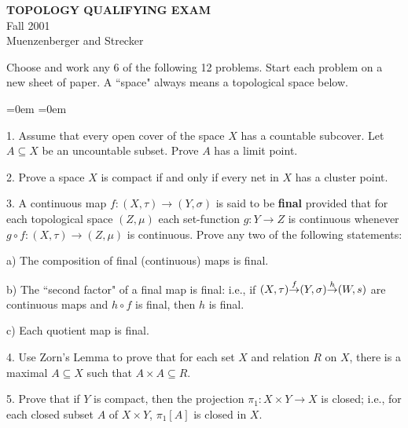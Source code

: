 \documentclass[10pt]{article}
\def\ds{\displaystyle}
\begin{document}
\def\R{{\mathbb R}}

\begin{large}
\begin{center}
{\bf
  TOPOLOGY QUALIFYING EXAM}\\
  Fall 2001\\
  Muenzenberger and Strecker
\end{center}


\vspace{.1in}
Choose and work any 6 of the following 12 problems. Start each problem on a
new sheet of paper. 
A ``space" always means a topological space below.

{
\begin{list}{}
{\itemsep=0em \parsep=0em }\item[]
\end{list}
}

\begin{description}

\item 1.
Assume that every open cover of the space $X$ has a countable subcover.
Let $A\subseteq X$ be an uncountable subset. Prove $A$ has a limit point.


\item 2.
Prove a space $X$ is compact if and only if every net in $X$ has a cluster
point.


\item 3.
A continuous map $f:(X,\tau)\to (Y,\sigma)$ is said to be \textbf{final}
provided that for each topological space $(Z,\mu)$ each set-function
$g:Y\to Z$ is continuous whenever $g\circ f:(X,\tau)\to(Z,\mu)$ is
continuous. Prove any two of the following statements:


\quad a)
The composition of final (continuous) maps is final.


\quad b)
The ``second factor" of a final map is final: i.e., if
$\ds{ (X,\tau) {\buildrel f\over\to} (Y,\sigma) {\buildrel h\over\to}
(W,s)}$
are continuous maps and $h\circ f$ is final, then $h$ is final.

\quad c)
Each quotient map is final.

\item 4.
Use Zorn's Lemma to prove that for each set $X$ and relation $R$ on $X$,
there is a maximal $A\subseteq X$ such that $A\times A\subseteq R$.


\item 5.
Prove that if $Y$ is compact, then the projection $\pi_1:X\times Y\to X$
is closed;
i.e., for each closed subset $A$ of $X\times Y$, $\pi_1[A]$ is closed in $X$.



\end{description}
\end{large}
\end{document}
